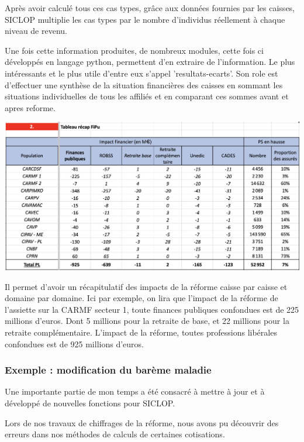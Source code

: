 Après avoir calculé tous ces cas types, grâce aux données fournies par les caisses, SICLOP multiplie les cas types par le nombre d'individus réellement à chaque niveau de revenu.

Une fois cette information produites, de nombreux modules, cette fois ci développés en langage python, permettent d'en extraire de l'information. Le plus intéressants et le plus utile d'entre eux s'appel 'resultats-ecarts'. Son role est d'effectuer une synthèse de la situation financières des caisses en sommant les situations individuelles de tous les affiliés et en comparant ces sommes avant et apres reforme.

\begin{center}
	\includegraphics[scale=0.53]{figures/chap2/format5B.png}
\end{center}

Il permet d'avoir un récapitulatif des impacts de la réforme caisse par caisse et domaine par domaine. Ici par exemple, on lira que l'impact de la réforme de l'assiette sur la CARMF secteur 1, toute finances publiques confondues est de 225 millions d'euros. Dont 5 millions pour la retraite de base, et 22 millions pour la retraite complémentaire. L'impact de la réforme, toutes professions libérales confondues est de 925 millions d'euros.


\subsubsection{Exemple : modification du barème maladie}

Une importante partie de mon temps a été consacré à mettre à jour et à développé de nouvelles fonctions pour SICLOP.

Lors de nos travaux de chiffrages de la réforme, nous avons pu découvrir des erreurs dans nos méthodes de calculs de certaines cotisations.

